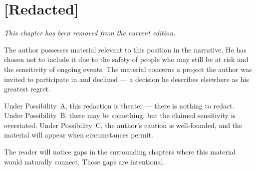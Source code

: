 
\chapter{[Redacted]}
\label{ch:redacted-chapter}

\vspace{2cm}

\begin{center}
\large\textit{This chapter has been removed from the current edition.}

\vspace{1cm}

\normalsize
The author possesses material relevant to this position in the narrative. He has chosen not to include it due to the safety of people who may still be at risk and the sensitivity of ongoing events. The material concerns a project the author was invited to participate in and declined --- a decision he describes elsewhere as his greatest regret.

\vspace{0.5cm}

Under Possibility~A, this redaction is theater --- there is nothing to redact. Under Possibility~B, there may be something, but the claimed sensitivity is overstated. Under Possibility~C, the author's caution is well-founded, and the material will appear when circumstances permit.

\vspace{0.5cm}

The reader will notice gaps in the surrounding chapters where this material would naturally connect. Those gaps are intentional.
\end{center}

\chapterreturn
